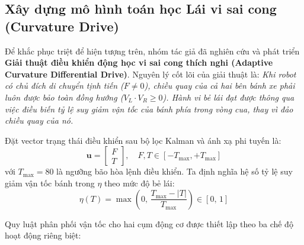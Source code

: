 \subsection{Xây dựng mô hình toán học Lái vi sai cong (Curvature Drive)}

Để khắc phục triệt để hiện tượng trên, nhóm tác giả đã nghiên cứu và phát triển \textbf{Giải thuật điều khiển động học vi sai cong thích nghi (Adaptive Curvature Differential Drive)}. Nguyên lý cốt lõi của giải thuật là: \textit{Khi robot có chủ đích di chuyển tịnh tiến ($F \neq 0$), chiều quay của cả hai bên bánh xe phải luôn được bảo toàn đồng hướng ($V_L \cdot V_R \ge 0$). Hành vi bẻ lái đạt được thông qua việc điều biến tỷ lệ suy giảm vận tốc của bánh phía trong vòng cua, thay vì đảo chiều quay của nó.}

Đặt vector trạng thái điều khiển sau bộ lọc Kalman và ánh xạ phi tuyến là:
\begin{equation}
\mathbf{u} = \begin{bmatrix} F \\ T \end{bmatrix}, \quad F, T \in [-T_{\max}, +T_{\max}]
\end{equation}
với $T_{\max} = 80$ là ngưỡng bão hòa lệnh điều khiển. Ta định nghĩa hệ số tỷ lệ suy giảm vận tốc bánh trong $\eta$ theo mức độ bẻ lái:
\begin{equation}
\eta(T) = \max\left(0,\, \frac{T_{\max} - |T|}{T_{\max}}\right) \in [0,\, 1]
\end{equation}

Quy luật phân phối vận tốc cho hai cụm động cơ được thiết lập theo ba chế độ hoạt động riêng biệt:

